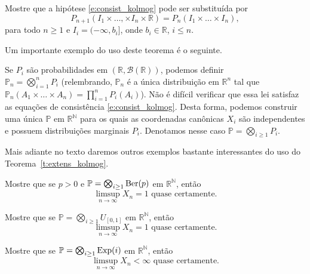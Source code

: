 \begin{exercise}
  Mostre que a hipótese \eqref{e:consist_kolmog} pode ser substituída por
  \begin{equation}
    P_{n+1} (I_1 \times \dots, \times I_n \times \mathbb{R}) = P_n (I_1 \times \dots \times I_n),
  \end{equation}
  para todo $n \geq 1$ e $I_i = (-\infty, b_i]$, onde $b_i \in \mathbb{R}$, $i \leq n$.
\end{exercise}

Um importante exemplo do uso deste teorema é o seguinte.

\begin{example}
  Se $P_i$ são probabilidades em $(\mathbb{R}, \mathcal{B}(\mathbb{R}))$, podemos definir \\
  $\mathbb{P}_n = \bigotimes_{i=1}^n P_i$ (relembrando, $\mathbb{P}_n$ é a única distribuição em $\mathbb{R}^n$ tal que $\mathbb{P}_n(A_1 \times \dots \times A_n) = \prod_{i=1}^n P_i(A_i)$).
  Não é difícil verificar que essa lei satisfaz as equações de consistência \eqref{e:consist_kolmog}.
  Desta forma, podemos construir uma única $\mathbb{P}$ em $\mathbb{R}^\mathbb{N}$ para os quais as coordenadas canônicas $X_i$ são independentes e possuem distribuições marginais $P_i$.
  Denotamos nesse caso $\mathbb{P} = \bigotimes_{i \geq 1} P_i$.
\end{example}

Mais adiante no texto daremos outros exemplos bastante interessantes do uso do Teorema~\ref{t:extens_kolmog}.

\begin{exercise}
  Mostre que se $p > 0$ e $\mathbb{P} = \bigotimes_{i \geq 1} \operatorname{Ber}(p)$ em $\mathbb{R}^\mathbb{N}$, então
  \begin{equation}
    \text{$\limsup_{n\to \infty} X_n = 1$ quase certamente.}
  \end{equation}
\end{exercise}

\begin{exercise}
  Mostre que se $\mathbb{P} = \bigotimes_{i \geq 1} U_{[0,1]}$ em $\mathbb{R}^\mathbb{N}$, então
  \begin{equation}
    \text{$\limsup_{n\to \infty} X_n = 1$ quase certamente.}
  \end{equation}
\end{exercise}

\begin{exercise}
  Mostre que se $\mathbb{P} = \bigotimes_{i \geq 1} \operatorname{Exp}(i)$ em $\mathbb{R}^\mathbb{N}$, então
  \begin{equation}
    \text{$\limsup_{n\to \infty} X_n < \infty$ quase certamente.}
  \end{equation}
\end{exercise}

